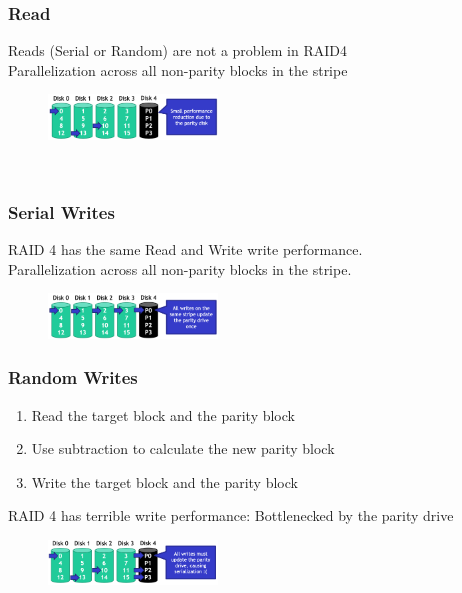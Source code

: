 \documentclass[10pt, oneside]{article}
\begin{document}
\subsubsection*{Read}
\begin{multicols}{2}
Reads (Serial or Random) are not a problem in RAID4\\ Parallelization across all non-parity blocks in the stripe
\columnbreak
\begin{figure}[H]
    \begin{center}
    \includegraphics[width=0.4\textwidth]{img/img75.png}
    \end{center}
\end{figure}
\end{multicols}\
\begin{multicols}{2}
    \subsubsection*{Serial Writes}
    RAID 4 has the same Read and Write write performance.\\Parallelization across all non-parity blocks in the stripe.\begin{figure}[H]
        \begin{center}
        \includegraphics[width=0.4\textwidth]{img/img76.png}
        \end{center}
    \end{figure}
    \columnbreak
    \subsubsection*{Random Writes}
    \begin{enumerate}
        \item Read the target block and the parity block
        \item Use subtraction to calculate the new parity block
        \item Write the target block and the parity block
    \end{enumerate}
    RAID 4 has terrible write performance: Bottlenecked by the parity drive
    \begin{figure}[H]
        \begin{center}
        \includegraphics[width=0.4\textwidth]{img/img77.png}
        \end{center}
    \end{figure}
\end{multicols}
\end{document}
